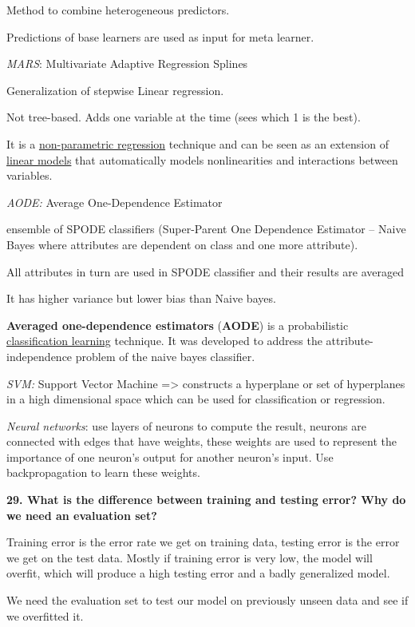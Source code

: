 Method to combine heterogeneous predictors.

Predictions of base learners are used as input for meta learner.

\textit{MARS}: Multivariate Adaptive Regression Splines

Generalization of stepwise Linear regression.

Not tree-based. Adds one variable at the time (sees which 1 is the
best).

It is a
\href{https://en.wikipedia.org/wiki/Non-parametric_regression}{non-parametric
regression} technique and can be seen as an extension of
\href{https://en.wikipedia.org/wiki/Linear_model}{linear models} that
automatically models nonlinearities and interactions between variables.

\textit{AODE:} Average One-Dependence Estimator

ensemble of SPODE classifiers (Super-Parent One Dependence Estimator --
Naive Bayes where attributes are dependent on class and one more
attribute).

All attributes in turn are used in SPODE classifier and their results
are averaged

It has higher variance but lower bias than Naive bayes.

\textbf{Averaged one-dependence estimators} (\textbf{AODE}) is a
probabilistic
\href{https://en.wikipedia.org/wiki/Classifier_(mathematics)}{classification
learning} technique. It was developed to address the
attribute-independence problem of the naive bayes classifier.

\textit{SVM:} Support Vector Machine =\textgreater{} constructs a
hyperplane or set of hyperplanes in a high dimensional space which can
be used for classification or regression.

\textit{Neural networks}: use layers of neurons to compute the
result, neurons are connected with edges that have weights, these
weights are used to represent the importance of one neuron's output for
another neuron's input. Use backpropagation to learn these weights.

\textbf{29. What is the difference between training and testing error?
Why do we need an evaluation set?}

Training error is the error rate we get on training data, testing error
is the error we get on the test data. Mostly if training error is very
low, the model will overfit, which will produce a high testing error and
a badly generalized model.

We need the evaluation set to test our model on previously unseen data
and see if we overfitted it.

